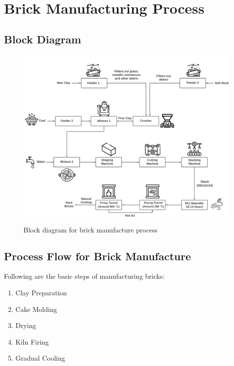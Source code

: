 \section{Brick Manufacturing Process}

\subsection{Block Diagram}
\begin{figure}[h]
  \centering
  \includegraphics[width=1\textwidth]{img/block diagram.png}
  \caption{Block diagram for brick manufacture process}
\end{figure}

\subsection{Process Flow for Brick Manufacture}
Following are the basic steps of manufacturing bricks:
\begin{enumerate}
\item Clay Preparation
\item Cake Molding
\item Drying
\item Kiln Firing
\item Gradual Cooling
\end{enumerate}

\newpage

